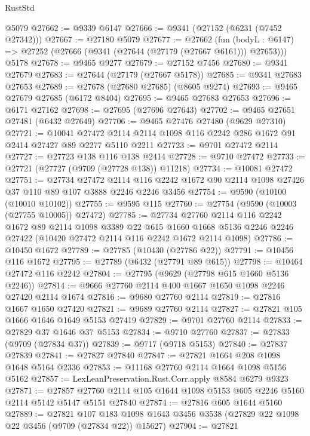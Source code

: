 \begin{lexlean}{RustStd}
\begin{coremodule}
    @5079
@27662 := @9339 @6147
@27666 := @9341 (@27152 (@6231 (@7452 @27342)))
@27667 := @27180 @5079
@27677 := @27662
    (fun (bodyL : @6147) => @27252 (@27666 (@9341 (@27644 (@27179 (@27667 @6161))) @27653)))
    @5178
@27678 := @9465 @9277
@27679 := @27152 @7456
@27680 := @9341 @27679
@27683 := @27644 (@27179 (@27667 @5178))
@27685 := @9341 @27683 @27653
@27689 := @27678 (@27680 @27685) (@8605 @9274)
@27693 := @9465 @27679 @27685 (@6172 @8404)
@27695 := @9465 @27683 @27653
@27696 := @6171 @27162
@27698 := @27695 (@27696 @27643)
@27702 := @9465 @27651 @27481 (@6432 @27649)
@27706 := @9465 @27476 @27480 (@9629 @27310)
@27721 := @10041
    @27472
    @2114
    @2114
    @1098
    @116
    @2242
    @286
    @1672
    @91
    @2414
    @27427
    @89
    @2277
    @5110
    @2211
@27723 := @9701 @27472 @2114
@27727 := @27723 @138 @116 @138 @2414
@27728 := @9710 @27472
@27733 := @27721 (@27727 (@9709 (@27728 @138)) @11218)
@27734 := @10081 @27472
@27751 := @27734
    @27472
    @2114
    @116
    @2242
    @1672
    @90
    @2114
    @1098
    @27426
    @37
    @110
    @89
    @107
    @3888
    @2246
    @2246
    @3456
@27754 := @9590 (@10100 (@10010 @10102))
@27755 := @9595 @115
@27760 := @27754 (@9590 (@10003 (@27755 @10005)) @27472)
@27785 := @27734
    @27760
    @2114
    @116
    @2242
    @1672
    @89
    @2114
    @1098
    @3389
    @22
    @615
    @1660
    @1668
    @5136
    @2246
    @2246
    @27422
    (@10420 @27472 @2114 @116 @2242 @1672 @2114 @1098)
@27786 := @10450 @1672
@27789 := @27785 (@10430 (@27786 @22))
@27791 := @10456 @116 @1672
@27795 := @27789 (@6432 (@27791 @89 @615))
@27798 := @10464 @27472 @116 @2242
@27804 := @27795 (@9629 (@27798 @615 @1660 @5136 @2246))
@27814 := @9666 @27760 @2114 @400 @1667 @1650 @1098 @2246 @27420 @2114 @1674
@27816 := @9680 @27760 @2114
@27819 := @27816 @1667 @1650 @27420
@27821 := @9689 @27760 @2114
@27827 := @27821 @105 @1666 @1646 @1649 @5153 @27419
@27829 := @9701 @27760 @2114
@27833 := @27829 @37 @1646 @37 @5153
@27834 := @9710 @27760
@27837 := @27833 (@9709 (@27834 @37))
@27839 := @9717 (@9718 @5153)
@27840 := @27837 @27839
@27841 := @27827 @27840
@27847 := @27821 @1664 @208 @1098 @1648 @5164 @2336
@27853 := @11168 @27760 @2114 @1664 @1098 @5156 @5162
@27857 := LexLeanPreservation.Rust.Corr.apply @8584 @6279 @9323
@27871 := @27857 @27760 @2114 @105 @1644 @1098 @5153 @605 @2246 @5160 @2114 @5142 @5147 @5151 @27840
@27874 := @27816 @605 @1644 @5160
@27889 := @27821
    @107
    @183
    @1098
    @1643
    @3456
    @3538
    (@27829 @22 @1098 @22 @3456 (@9709 (@27834 @22)) @15627)
@27904 := @27821

\end{coremodule}
\end{lexlean}
